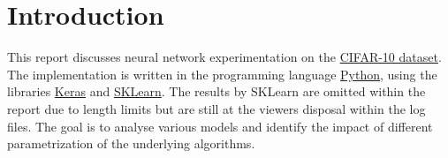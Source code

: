 \chapter{Introduction}
This report discusses neural network experimentation on the \href{https://www.cs.toronto.edu/~kriz/cifar.html}{CIFAR-10 dataset}.
The implementation is written in the programming language \href{https://www.python.org/}{Python}, using the libraries \href{https://keras.io/}{Keras} and \href{https://scikit-learn.org/stable/}{SKLearn}.
The results by SKLearn are omitted within the report due to length limits but are still at the viewers disposal within the log files.
The goal is to analyse various models and identify the impact of different parametrization of the underlying algorithms.